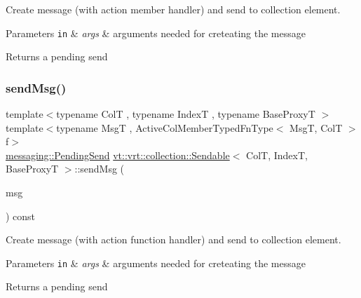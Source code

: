 Create message (with action member handler) and send to collection element. 


\begin{DoxyParams}[1]{Parameters}
\mbox{\tt in}  & {\em args} & arguments needed for creteating the message\\
\hline
\end{DoxyParams}
\begin{DoxyReturn}{Returns}
a pending send 
\end{DoxyReturn}
\mbox{\label{structvt_1_1vrt_1_1collection_1_1_sendable_a1bae1b58a1ce80fd76ee43ff4d33905a}} 
\subsubsection{\texorpdfstring{send\+Msg()}{sendMsg()}\hspace{0.1cm}{\footnotesize\ttfamily [1/2]}}
{\footnotesize\ttfamily template$<$typename ColT , typename IndexT , typename Base\+ProxyT $>$ \\
template$<$typename MsgT , Active\+Col\+Member\+Typed\+Fn\+Type$<$ Msg\+T, Col\+T $>$ f$>$ \\
\hyperlink{structvt_1_1messaging_1_1_pending_send}{messaging\+::\+Pending\+Send} \hyperlink{structvt_1_1vrt_1_1collection_1_1_sendable}{vt\+::vrt\+::collection\+::\+Sendable}$<$ ColT, IndexT, Base\+ProxyT $>$\+::send\+Msg (\begin{DoxyParamCaption}\item[{\hyperlink{structvt_1_1messaging_1_1_msg_ptr_thief}{messaging\+::\+Msg\+Ptr\+Thief}$<$ MsgT $>$}]{msg }\end{DoxyParamCaption}) const}



Create message (with action function handler) and send to collection element. 


\begin{DoxyParams}[1]{Parameters}
\mbox{\tt in}  & {\em args} & arguments needed for creteating the message\\
\hline
\end{DoxyParams}
\begin{DoxyReturn}{Returns}
a pending send 
\end{DoxyReturn}
\mbox{\label{structvt_1_1vrt_1_1collection_1_1_sendable_a1bae1b58a1ce80fd76ee43ff4d33905a}} 

